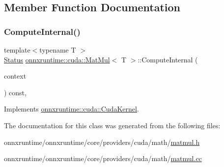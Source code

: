\subsection{Member Function Documentation}
\mbox{\label{classonnxruntime_1_1cuda_1_1MatMul_a78ef9bfa2814c487d9ef0a726601b6dc}} 
\subsubsection{\texorpdfstring{Compute\+Internal()}{ComputeInternal()}}
{\footnotesize\ttfamily template$<$typename T $>$ \\
\mbox{\hyperlink{classonnxruntime_1_1common_1_1Status}{Status}} \mbox{\hyperlink{classonnxruntime_1_1cuda_1_1MatMul}{onnxruntime\+::cuda\+::\+Mat\+Mul}}$<$ T $>$\+::Compute\+Internal (\begin{DoxyParamCaption}\item[{\mbox{\hyperlink{classonnxruntime_1_1OpKernelContext}{Op\+Kernel\+Context}} $\ast$}]{context }\end{DoxyParamCaption}) const\hspace{0.3cm}{\ttfamily [override]}, {\ttfamily [virtual]}}



Implements \mbox{\hyperlink{classonnxruntime_1_1cuda_1_1CudaKernel_aca7af04ae448017d6023d30bba231ebb}{onnxruntime\+::cuda\+::\+Cuda\+Kernel}}.



The documentation for this class was generated from the following files\+:\begin{DoxyCompactItemize}
\item 
onnxruntime/onnxruntime/core/providers/cuda/math/\mbox{\hyperlink{cuda_2math_2matmul_8h}{matmul.\+h}}\item 
onnxruntime/onnxruntime/core/providers/cuda/math/\mbox{\hyperlink{cuda_2math_2matmul_8cc}{matmul.\+cc}}\end{DoxyCompactItemize}
